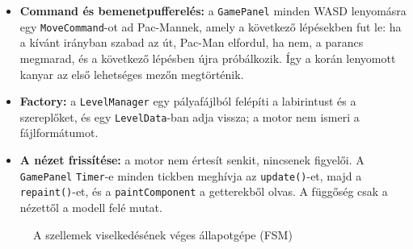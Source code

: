 \documentclass[11pt, a4paper]{article}
\begin{document}
\begin{itemize}[itemsep=3pt]
    Az ijedt szellem fehér, a \texttt{DEAD} szellem csak egy kis szürke pont (a szeme), és ártalmatlan. Életvesztéskor a \texttt{resetToStart()} mindenkit \texttt{CHASE}-re állít; ez újraindítás, nem az ábra éle.
    \item \textbf{Command és bemenetpufferelés:} a \texttt{GamePanel} minden WASD lenyomásra egy \texttt{MoveCommand}-ot ad Pac-Mannek, amely a következő lépésekben fut le: ha a kívánt irányban szabad az út, Pac-Man elfordul, ha nem, a parancs megmarad, és a következő lépésben újra próbálkozik. Így a korán lenyomott kanyar az első lehetséges mezőn megtörténik.
    \item \textbf{Factory:} a \texttt{LevelManager} egy pályafájlból felépíti a labirintust és a szereplőket, és egy \texttt{LevelData}-ban adja vissza; a motor nem ismeri a fájlformátumot.
    \item \textbf{A nézet frissítése:} a motor nem értesít senkit, nincsenek figyelői. A \texttt{GamePanel} \texttt{Timer}-e minden tickben meghívja az \texttt{update()}-et, majd a \texttt{repaint()}-et, és a \texttt{paintComponent} a getterekből olvas. A függőség csak a nézettől a modell felé mutat.
\end{itemize}

\begin{figure}[ht]
    \centering
    \caption{A szellemek viselkedésének véges állapotgépe (FSM)}
    \label{fig:ghost_fsm}
\end{figure}

\end{document}
